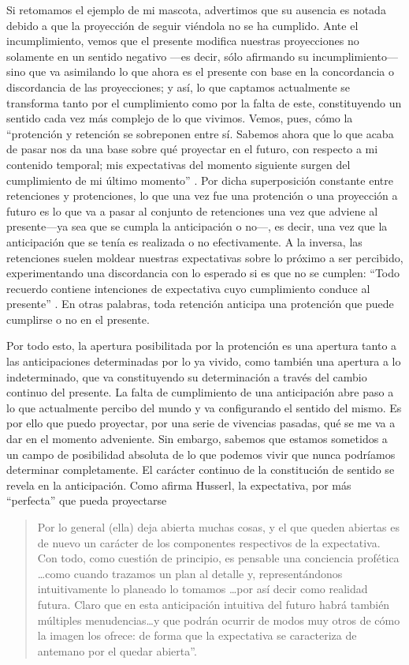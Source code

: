 Si retomamos el ejemplo de mi mascota, advertimos que su ausencia es
notada debido a que la proyección de seguir viéndola no se ha cumplido.
Ante el incumplimiento, vemos que el presente modifica nuestras
proyecciones no solamente en un sentido negativo ---es decir, sólo
afirmando su incumplimiento--- sino que va asimilando lo que ahora es el
presente con base en la concordancia o discordancia de las proyecciones;
y así, lo que captamos actualmente se transforma tanto por el
cumplimiento como por la falta de este, constituyendo un sentido cada
vez más complejo de lo que vivimos. Vemos, pues, cómo la ``protención y
retención se sobreponen entre sí. Sabemos ahora que lo que acaba de
pasar nos da una base sobre qué proyectar en el futuro, con respecto a
mi contenido temporal; mis expectativas del momento siguiente surgen del
cumplimiento de mi último momento'' \cite[p.~132]{rodemeyer2003}. Por dicha
superposición constante entre retenciones y protenciones, lo que una vez
fue una protención o una proyección a futuro es lo que va a pasar al
conjunto de retenciones una vez que adviene al presente---ya sea que se
cumpla la anticipación o no---, es decir, una vez que la anticipación
que se tenía es realizada o no efectivamente. A la inversa, las
retenciones suelen moldear nuestras expectativas sobre lo próximo a ser
percibido, experimentando una discordancia con lo esperado si es que no
se cumplen: ``Todo recuerdo contiene intenciones de expectativa cuyo
cumplimiento conduce al presente'' \cite[§24, p.~73]{husserl2002}. En otras
palabras, toda retención anticipa una protención que puede cumplirse o
no en el presente.

Por todo esto, la apertura posibilitada por la protención es una
apertura tanto a las anticipaciones determinadas por lo ya vivido, como
también una apertura a lo indeterminado, que va constituyendo su
determinación a través del cambio continuo del presente. La falta de
cumplimiento de una anticipación abre paso a lo que actualmente percibo
del mundo y va configurando el sentido del mismo. Es por ello que puedo
proyectar, por una serie de vivencias pasadas, qué se me va a dar en el
momento adveniente. Sin embargo, sabemos que estamos sometidos a un
campo de posibilidad absoluta de lo que podemos vivir que nunca
podríamos determinar completamente. El carácter continuo de la
constitución de sentido se revela en la anticipación. Como afirma
Husserl, la expectativa, por más ``perfecta'' que pueda proyectarse

\begin{quote}
Por lo general (ella) deja abierta muchas cosas, y el que queden
abiertas es de nuevo un carácter de los componentes respectivos de la
expectativa. Con todo, como cuestión de principio, es pensable una
conciencia profética \ldots como cuando trazamos un plan al
detalle y, representándonos intuitivamente lo planeado lo tomamos
\ldots por así decir como realidad futura. Claro que en esta
anticipación intuitiva del futuro habrá también múltiples
menudencias\ldots y que podrán ocurrir de modos muy otros de cómo la
imagen los ofrece: de forma que la expectativa se caracteriza de
antemano por el quedar abierta''\cite[§26, p.~77]{husserl2002}.
\end{quote}

